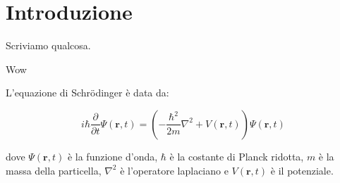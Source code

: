 \chapter{Introduzione}

Scriviamo qualcosa.



Wow

L'equazione di Schrödinger è data da:

\begin{equation}
i\hbar \frac{\partial}{\partial t} \Psi(\mathbf{r}, t) = \left( -\frac{\hbar^2}{2m} \nabla^2 + V(\mathbf{r}, t) \right) \Psi(\mathbf{r}, t)
\end{equation}

dove $\Psi(\mathbf{r}, t)$ è la funzione d'onda, $\hbar$ è la costante di Planck ridotta, $m$ è la massa della particella, $\nabla^2$ è l'operatore laplaciano e $V(\mathbf{r}, t)$ è il potenziale.
